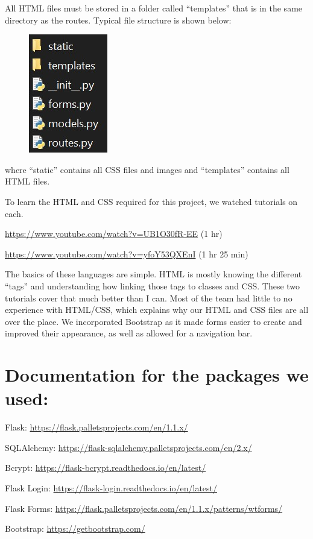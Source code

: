 \documentclass[]{book}
\begin{document}
All HTML files must be stored in a folder called ``templates'' that is
in the same directory as the routes. Typical file structure is shown
below:

\begin{figure}
\centering
\includegraphics{images/file_structure.jpg}
\caption{}
\end{figure}

where ``static'' contains all CSS files and images and ``templates''
contains all HTML files.

To learn the HTML and CSS required for this project, we watched
tutorials on each.

\url{https://www.youtube.com/watch?v=UB1O30fR-EE} (1 hr)

\url{https://www.youtube.com/watch?v=yfoY53QXEnI} (1 hr 25 min)

The basics of these languages are simple. HTML is mostly knowing the
different ``tags'' and understanding how linking those tags to classes
and CSS. These two tutorials cover that much better than I can. Most of
the team had little to no experience with HTML/CSS, which explains why
our HTML and CSS files are all over the place. We incorporated Bootstrap
as it made forms easier to create and improved their appearance, as well
as allowed for a navigation bar.

\section{Documentation for the packages we
used:}\label{documentation-for-the-packages-we-used}

Flask: \url{https://flask.palletsprojects.com/en/1.1.x/}

SQLAlchemy: \url{https://flask-sqlalchemy.palletsprojects.com/en/2.x/}

Bcrypt: \url{https://flask-bcrypt.readthedocs.io/en/latest/}

Flask Login: \url{https://flask-login.readthedocs.io/en/latest/}

Flask Forms:
\url{https://flask.palletsprojects.com/en/1.1.x/patterns/wtforms/}

Bootstrap: \url{https://getbootstrap.com/}
\end{document}
